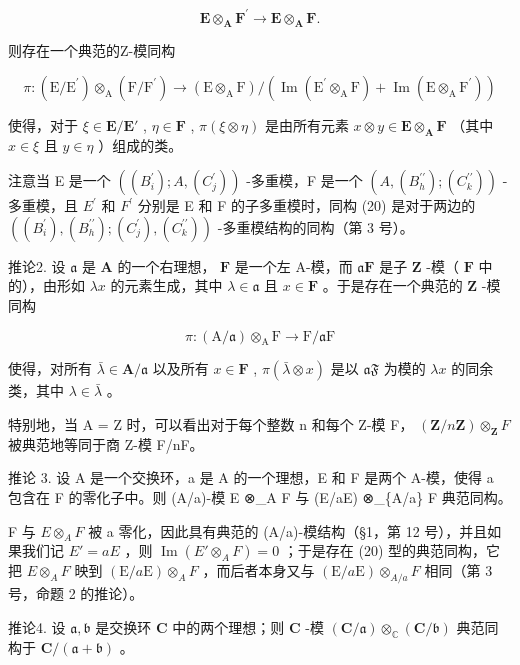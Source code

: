 \[
\mathbf {E} \otimes_ {\mathbf {A}} \mathbf {F} ^ {\prime} \rightarrow \mathbf {E} \otimes_ {\mathbf {A}} \mathbf {F}.
\]

则存在一个典范的Z-模同构

\[
\pi : (\mathrm{E} / \mathrm{E} ^ {\prime}) \otimes_ {\mathrm{A}} (\mathrm{F} / \mathrm{F} ^ {\prime}) \rightarrow (\mathrm{E} \otimes_ {\mathrm{A}} \mathrm{F}) / (\operatorname{Im} (\mathrm{E} ^ {\prime} \otimes_ {\mathrm{A}} \mathrm{F}) + \operatorname{Im} (\mathrm{E} \otimes_ {\mathrm{A}} \mathrm{F} ^ {\prime}))\tag{20}
\]

使得，对于 \(\xi \in \mathbf{E} / \mathbf{E}'\) , \(\eta \in \mathbf{F}\) , \(\pi (\xi \otimes \eta)\) 是由所有元素 \(x \otimes y \in \mathbf{E} \otimes_{\mathbf{A}} \mathbf{F}\) （其中 \(x \in \xi\) 且 \(y \in \eta\) ）组成的类。

注意当 E 是一个 \(((B_{i}^{\prime}); A, (C_{j}^{\prime}))\) -多重模，F 是一个 \((A, (B_{h}^{\prime\prime}); (C_{k}^{\prime\prime}))\) -多重模，且 \(E^{\prime}\) 和 \(F^{\prime}\) 分别是 E 和 F 的子多重模时，同构 (20) 是对于两边的 \(((B_{i}^{\prime}), (B_{h}^{\prime\prime}); (C_{j}^{\prime}), (C_{k}^{\prime\prime}))\) -多重模结构的同构（第 3 号）。

推论2. 设 \(\mathfrak{a}\) 是 \(\mathbf{A}\) 的一个右理想， \(\mathbf{F}\) 是一个左 A-模，而 \(\mathfrak{a}\mathbf{F}\) 是子 \(\mathbf{Z}\) -模（ \(\mathbf{F}\) 中的），由形如 \(\lambda x\) 的元素生成，其中 \(\lambda \in \mathfrak{a}\) 且 \(x \in \mathbf{F}\) 。于是存在一个典范的 \(\mathbf{Z}\) -模同构

\[
\pi : (\mathrm{A} / \mathfrak {a}) \otimes_ {\mathrm{A}} \mathrm{F} \rightarrow \mathrm{F} / \mathfrak {a} \mathrm{F}\tag{21}
\]

使得，对所有 \(\bar{\lambda} \in \mathbf{A} / \mathfrak{a}\) 以及所有 \(x \in \mathbf{F}\) , \(\pi(\bar{\lambda} \otimes x)\) 是以 \(\mathfrak{aF}\) 为模的 \(\lambda x\) 的同余类，其中 \(\lambda \in \bar{\lambda}\) 。

特别地，当 A = Z 时，可以看出对于每个整数 n 和每个 Z-模 F， \((\mathbf{Z}/n\mathbf{Z}) \otimes_{\mathbf{Z}} F\) 被典范地等同于商 Z-模 F/nF。

推论 3. 设 A 是一个交换环，a 是 A 的一个理想，E 和 F 是两个 A-模，使得 a 包含在 F 的零化子中。则 (A/a)-模 E ⊗\_A F 与 (E/aE) ⊗\_\{A/a\} F 典范同构。

F 与 \(E \otimes_{A} F\) 被 a 零化，因此具有典范的 (A/a)-模结构（§1，第 12 号），并且如果我们记 \(E' = aE\) ，则 \(\operatorname{Im}(E' \otimes_{A} F) = 0\) ；于是存在 (20) 型的典范同构，它把 \(E \otimes_{A} F\) 映到 \((\mathrm{E}/a\mathrm{E}) \otimes_{A} F\) ，而后者本身又与 \((\mathrm{E}/a\mathrm{E}) \otimes_{A/a} F\) 相同（第 3 号，命题 2 的推论）。

推论4. 设 \(\mathfrak{a}, \mathfrak{b}\) 是交换环 \(\mathbf{C}\) 中的两个理想；则 \(\mathbf{C}\) -模 \((\mathbf{C} / \mathfrak{a}) \otimes_{\mathbb{C}} (\mathbf{C} / \mathfrak{b})\) 典范同构于 \(\mathbf{C}/(\mathfrak{a} + \mathfrak{b})\) 。

